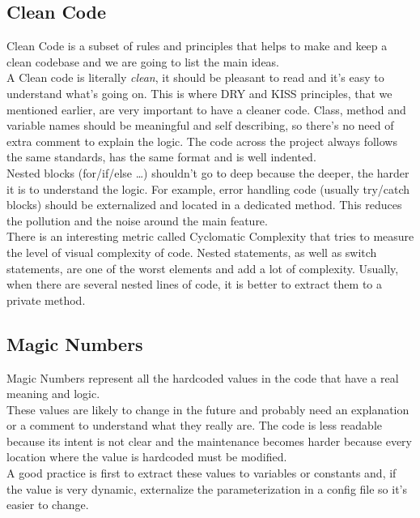 \subsection{Clean Code}\label{subsec:clean-code}
Clean Code is a subset of rules and principles that helps to make and
keep a clean codebase and we are going to list the main ideas. \\
\newline
A Clean code is literally \textit{clean}, it should be
pleasant to read and it's easy to understand what's going on.
This is where DRY and KISS principles, that we mentioned earlier,
are very important to have a cleaner code.
Class, method and variable names should be meaningful and self
describing, so there's no need of extra comment to explain the logic.
The code across the project always follows the same standards, has the
same format and is well indented. \\
\newline
Nested blocks (for/if/else \ldots) shouldn't go to deep
because the deeper, the harder it is to understand the logic.
For example, error handling code (usually try/catch blocks) should be
externalized and located in a dedicated method.
This reduces the pollution and the noise around the main feature. \\
There is an interesting metric called Cyclomatic Complexity that tries to
measure the level of visual complexity of code.
Nested statements, as well as switch statements, are one of the worst
elements and add a lot of complexity.
Usually, when there are several nested lines of code, it is better to
extract them to a private method.

\subsection{Magic Numbers}\label{subsec:magic-numbers}
Magic Numbers represent all the hardcoded values in the code that have
a real meaning and logic. \\
\newline
These values are likely to change in the future and probably need an
explanation or a comment to understand what they really are.
The code is less readable because its intent is not clear and the
maintenance becomes harder because every location where the value
is hardcoded must be modified. \\
A good practice is first to extract these values to variables or
constants and, if the value is very dynamic, externalize the
parameterization in a config file so it's easier to change.


